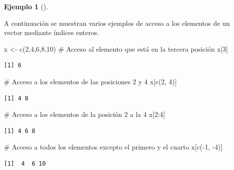 \documentclass[
  a4paper,
]{scrreport}
\newenvironment{Shaded}{\begin{snugshade}}{\end{snugshade}}
\newcommand{\CommentTok}[1]{\textcolor[rgb]{0.37,0.37,0.37}{#1}}
\newcommand{\DecValTok}[1]{\textcolor[rgb]{0.68,0.00,0.00}{#1}}
\newcommand{\FunctionTok}[1]{\textcolor[rgb]{0.28,0.35,0.67}{#1}}
\newcommand{\NormalTok}[1]{\textcolor[rgb]{0.00,0.23,0.31}{#1}}
\newcommand{\OtherTok}[1]{\textcolor[rgb]{0.00,0.23,0.31}{#1}}
\newcommand{\SpecialCharTok}[1]{\textcolor[rgb]{0.37,0.37,0.37}{#1}}
\theoremstyle{definition}
\newtheorem{example}{Ejemplo}[chapter]
\theoremstyle{definition}
\theoremstyle{remark}
\begin{document}
\leavevmode{}%
\begin{example}[]\label{exm-acceso-vector}

A continuación se muestran varios ejemplos de acceso a los elementos de
un vector mediante índices enteros.

\begin{Shaded}
\begin{Highlighting}[]
\NormalTok{x }\OtherTok{\textless{}{-}} \FunctionTok{c}\NormalTok{(}\DecValTok{2}\NormalTok{,}\DecValTok{4}\NormalTok{,}\DecValTok{6}\NormalTok{,}\DecValTok{8}\NormalTok{,}\DecValTok{10}\NormalTok{)}
\CommentTok{\# Acceso al elemento que está en la tercera posición}
\NormalTok{x[}\DecValTok{3}\NormalTok{]}
\end{Highlighting}
\end{Shaded}

\begin{verbatim}
[1] 6
\end{verbatim}

\begin{Shaded}
\begin{Highlighting}[]
\CommentTok{\# Acceso a los elementos de las posiciones 2 y 4}
\NormalTok{x[}\FunctionTok{c}\NormalTok{(}\DecValTok{2}\NormalTok{, }\DecValTok{4}\NormalTok{)]}
\end{Highlighting}
\end{Shaded}

\begin{verbatim}
[1] 4 8
\end{verbatim}

\begin{Shaded}
\begin{Highlighting}[]
\CommentTok{\# Acceso a los elementos de la posición 2 a la 4}
\NormalTok{x[}\DecValTok{2}\SpecialCharTok{:}\DecValTok{4}\NormalTok{]}
\end{Highlighting}
\end{Shaded}

\begin{verbatim}
[1] 4 6 8
\end{verbatim}

\begin{Shaded}
\begin{Highlighting}[]
\CommentTok{\# Acceso a todos los elementos excepto el primero y el cuarto}
\NormalTok{x[}\FunctionTok{c}\NormalTok{(}\SpecialCharTok{{-}}\DecValTok{1}\NormalTok{, }\SpecialCharTok{{-}}\DecValTok{4}\NormalTok{)]}
\end{Highlighting}
\end{Shaded}

\begin{verbatim}
[1]  4  6 10
\end{verbatim}

\end{example}
\end{document}
